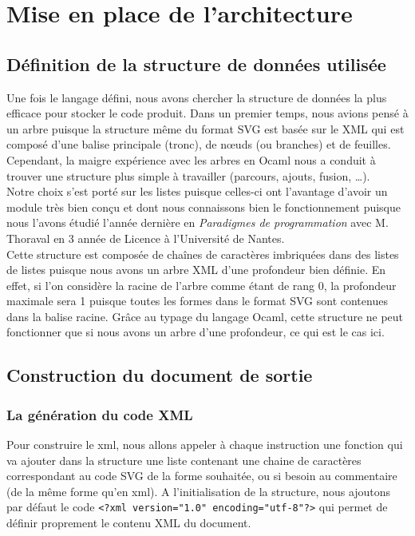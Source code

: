 	\section{Mise en place de l'architecture}
		\subsection{Définition de la structure de données utilisée}
		Une fois le langage défini, nous avons chercher la structure de données la plus efficace pour stocker le code produit. Dans un premier temps, nous avions pensé à un arbre puisque la structure même du format SVG est basée sur le XML qui est composé d'une balise principale (tronc), de nœuds (ou branches) et de feuilles. Cependant, la maigre expérience avec les arbres en Ocaml nous a conduit à trouver une structure plus simple à travailler (parcours, ajouts, fusion, \dots). \\
		
		Notre choix s'est porté sur les listes puisque celles-ci ont l'avantage d'avoir un module très bien conçu et dont nous connaissons bien le fonctionnement puisque nous l'avons étudié l'année dernière en \emph{Paradigmes de programmation} avec M. Thoraval en 3\ieme{} année de Licence à l'Université de Nantes. \\
		
		Cette structure est composée de chaînes de caractères imbriquées  dans des listes de listes puisque nous avons un arbre XML d'une profondeur bien définie. En effet, si l'on considère la racine de l'arbre comme étant de rang 0, la profondeur maximale sera 1 puisque toutes les formes dans le format SVG sont contenues dans la balise racine. Grâce au typage du langage Ocaml, cette structure ne peut fonctionner que si nous avons un arbre d'une profondeur, ce qui est le cas ici.
	 
		\subsection{Construction du document de sortie}
		
			\subsubsection{La génération du code XML}
		Pour construire le xml, nous allons appeler à chaque instruction une fonction qui va ajouter dans la structure une liste contenant une chaine de caractères correspondant au code SVG de la forme souhaitée, ou si besoin au commentaire (de la même forme qu'en xml). A l'initialisation de la structure, nous ajoutons par défaut le code \texttt{<?xml version="1.0" encoding="utf-8"?>} qui permet de définir proprement le contenu XML du document.\\
		

